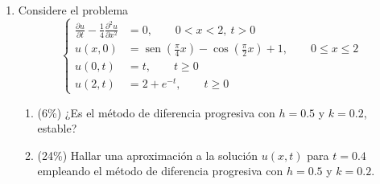 \documentclass[11pt]{article}
\begin{document}
\begin{enumerate}
\item{} Considere el problema
\[
\left\{
\begin{aligned}
\frac{\partial u}{\partial t}-\frac{1}{4}\frac{\partial^2 u}{\partial x^2} &= 0, \qquad 0<x<2,\ t>0\\
u(x,0) &= \operatorname{sen}\left(\frac{\pi}{4}x\right)-\cos\left(\frac{\pi}{2}x\right)+1, \qquad 0\leq x\leq 2\\
u(0,t) &= t, \qquad t\geq 0\\
u(2,t) &= 2+e^{-t}, \qquad t\geq 0
\end{aligned}
\right.
\]
\begin{enumerate}
\item{} (6\%) ¿Es el método de diferencia progresiva con $h=0.5$ y $k=0.2$, estable?

\vspace{3cm}

\item{} (24\%) Hallar una aproximación a la solución $u(x,t)$ para $t=0.4$ empleando el método de diferencia progresiva con $h=0.5$ y $k=0.2$.

\vspace{6cm}
\end{enumerate}
\end{enumerate}

\examfooter
\end{document}
